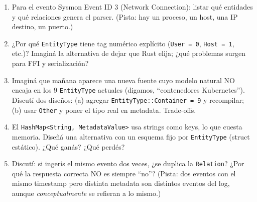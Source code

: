 \begin{ejercicios}
\begin{enumerate}
    \item \starred{} Para el evento Sysmon Event ID 3 (Network
    Connection): listar qué entidades y qué relaciones genera el
    parser. (Pista: hay un proceso, un host, una IP destino, un
    puerto.)

    \item ¿Por qué \texttt{EntityType} tiene tag numérico explícito
    (\texttt{User = 0}, \texttt{Host = 1}, etc.)? Imaginá la
    alternativa de dejar que Rust elija; ¿qué problemas surgen
    para FFI y serialización?

    \item Imaginá que mañana aparece una nueva fuente cuyo modelo
    natural NO encaja en los 9 \texttt{EntityType} actuales (digamos,
    ``contenedores Kubernetes''). Discutí dos diseños: (a) agregar
    \texttt{EntityType::Container = 9} y recompilar; (b) usar
    \texttt{Other} y poner el tipo real en metadata. Trade-offs.

    \item \starred{} El \texttt{HashMap<String, MetadataValue>} usa
    strings como keys, lo que cuesta memoria. Diseñá una alternativa
    con un esquema fijo por \texttt{EntityType} (struct estático).
    ¿Qué ganás? ¿Qué perdés?

    \item Discutí: si ingerís el mismo evento dos veces, ¿se duplica
    la \texttt{Relation}? ¿Por qué la respuesta correcta NO es
    siempre ``no''? (Pista: dos eventos con el mismo timestamp pero
    distinta metadata son distintos eventos del log, aunque
    \emph{conceptualmente} se refieran a lo mismo.)
\end{enumerate}
\end{ejercicios}
